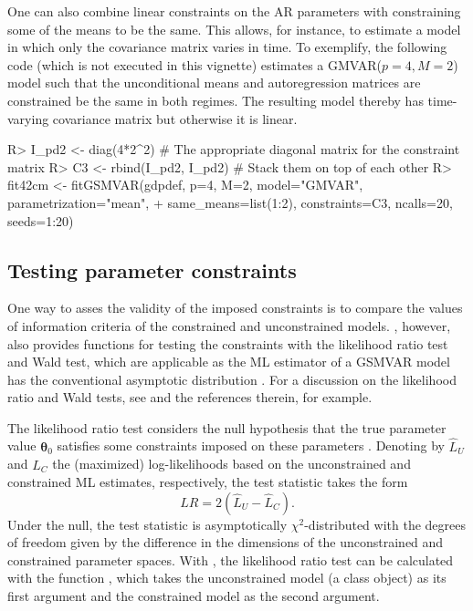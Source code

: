 \documentclass[nojss]{jss} %
\begin{document}
One can also combine linear constraints on the AR parameters with constraining some of the means to be the same. This allows, for instance, to estimate a model in which only the covariance matrix varies in time. To exemplify, the following code (which is not executed in this vignette) estimates a GMVAR($p=4, M=2$) model such that the unconditional means and autoregression matrices are constrained be the same in both regimes. The resulting model thereby has time-varying covariance matrix but otherwise it is linear.
%
\begin{CodeChunk}
\begin{CodeInput}
R> I_pd2 <- diag(4*2^2) # The appropriate diagonal matrix for the constraint matrix
R> C3 <- rbind(I_pd2, I_pd2) # Stack them on top of each other
R> fit42cm <- fitGSMVAR(gdpdef, p=4, M=2, model="GMVAR", parametrization="mean",
+               same_means=list(1:2), constraints=C3, ncalls=20, seeds=1:20)
\end{CodeInput}
\end{CodeChunk}
%


\subsection{Testing parameter constraints}\label{sec:testconst}
One way to asses the validity of the imposed constraints is to compare the values of information criteria of the constrained and unconstrained models. , however, also provides functions for testing the constraints with the likelihood ratio test and Wald test, which are applicable as the ML estimator of a GSMVAR model has the conventional asymptotic distribution \cite[as long as the model is correctly specified and one is willing to assume the validity of the required unverified assumptions; see][Theorem 3, and \cite{Kalliovirta+Meitz+Saikkonen:2016}, Theorem 3]{Virolainen2:2021}. For a discussion on the likelihood ratio and Wald tests, see \citet{Buse:1982} and the references therein, for example.

The likelihood ratio test considers the null hypothesis that the true parameter value $\boldsymbol{\theta}_0$ satisfies some constraints imposed on these parameters \cite[such that the constrained parameter space is a subset of the parameter space, which is presented in][Assumption 2 for the GSMVAR models]{Virolainen2:2021}. Denoting by $\hat{L}_U$ and $\hat{L}_C$ the (maximized) log-likelihoods based on the unconstrained and constrained ML estimates, respectively, the test statistic takes the form
\begin{equation}
LR=2(\hat{L}_U - \hat{L}_C).
\end{equation}
Under the null, the test statistic is asymptotically $\chi^2$-distributed with the degrees of freedom given by the difference in the dimensions of the unconstrained and constrained parameter spaces. With , the likelihood ratio test can be calculated with the function , which takes the unconstrained model (a class  object) as its first argument and the constrained model as the second argument.
\end{document}
